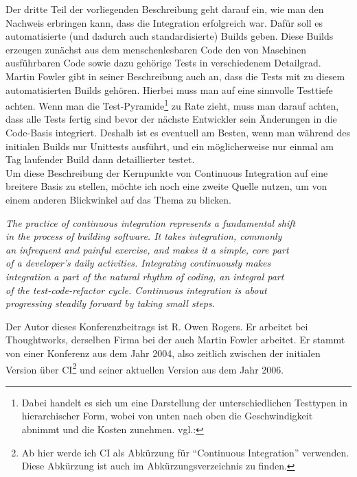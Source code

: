 Der dritte Teil der vorliegenden Beschreibung geht darauf ein, wie man den Nachweis erbringen kann, dass die Integration erfolgreich war. Dafür soll es automatisierte (und dadurch auch standardisierte) Builds geben. Diese Builds erzeugen zunächst aus dem menschenlesbaren Code den von Maschinen ausführbaren Code sowie dazu gehörige Tests in verschiedenem Detailgrad. Martin Fowler gibt in seiner Beschreibung auch an, dass die Tests mit zu diesem automatisierten Builds gehören. Hierbei muss man auf eine sinnvolle Testtiefe achten. Wenn man die Test-Pyramide\footnote{Dabei handelt es sich um eine Darstellung der unterschiedlichen Testtypen in hierarchischer Form, wobei von unten nach oben die Geschwindigkeit abnimmt und die Kosten zunehmen. vgl.:\cite{fowler-Testpyramid}} zu Rate zieht, muss man darauf achten, dass alle Tests fertig sind bevor der nächste Entwickler sein Änderungen in die Code-Basis integriert. Deshalb ist es eventuell am Besten, wenn man während des initialen Builds nur Unittests ausführt, und ein möglicherweise nur einmal am Tag laufender Build dann detaillierter testet.\\
Um diese Beschreibung der Kernpunkte von Continuous Integration auf eine breitere Basis zu stellen, möchte ich noch eine zweite Quelle nutzen, um von einem anderen Blickwinkel auf das Thema zu blicken.
\begin{center}
	\textit{
The practice of continuous integration represents a fundamental shift\\ in the process of building software. It takes integration, commonly\\
an infrequent and painful exercise, and makes it a simple, core part\\ of a developer’s daily activities. Integrating continuously makes\\ integration a part of the natural rhythm of coding, an integral part\\ of the test-code-refactor cycle. Continuous integration is about\\ progressing steadily forward by taking small steps.}\\ \cite{10.1007/978-3-540-24853-8_8}
\end{center}
Der Autor dieses Konferenzbeitrags ist R. Owen Rogers. Er arbeitet bei Thoughtworks, derselben Firma bei der auch Martin Fowler arbeitet. Er stammt von einer Konferenz aus dem Jahr 2004, also zeitlich zwischen der initialen Version über CI\footnote{Ab hier werde ich CI als Abkürzung für "`Continuous Integration"' verwenden. Diese Abkürzung ist auch im Abkürzungsverzeichnis zu finden.} und seiner aktuellen Version aus dem Jahr 2006.\\
